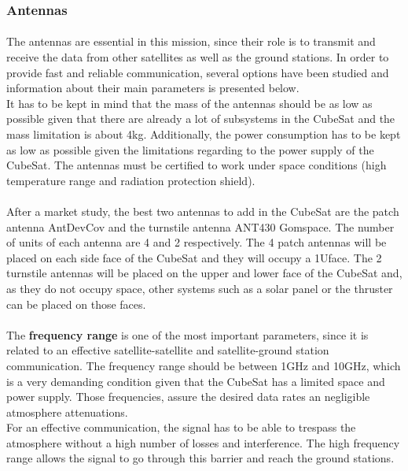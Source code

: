 \subsubsection{Antennas}
\paragraph{}The antennas are essential in this mission, since their role is to transmit and receive the data from other satellites as well as the ground stations. In order to provide fast and reliable communication, several options have been studied and information about their main parameters is presented below.\\
It has to be kept in mind that the mass of the antennas should be as low as possible given that there are already a lot of subsystems in the CubeSat and the mass limitation is about 4kg.
Additionally, the power consumption has to be kept as low as possible given the limitations regarding to the power supply of the CubeSat. The antennas must be certified to work under space conditions (high temperature range and radiation protection shield).

\paragraph{}After a market study, the best two antennas to add in the CubeSat are the patch antenna AntDevCov and the turnstile antenna ANT430 Gomspace. The number of units of each antenna are 4 and 2 respectively. The 4 patch antennas will be placed on each side face of the CubeSat and they will occupy a 1Uface. The 2 turnstile antennas will be placed on the upper and lower face of the CubeSat and, as they do not occupy space, other systems such as  a solar panel or the thruster can be placed on those faces.


\paragraph{}The \textbf{frequency range} is one of the most important parameters, since it is related to an effective satellite-satellite and satellite-ground station communication. The frequency range should be between 1GHz and 10GHz, which is a very demanding condition given that the CubeSat has a limited space and power supply. Those frequencies, assure the desired data rates an negligible atmosphere attenuations. \\
For an effective communication, the signal has to be able to trespass the atmosphere without a high number of losses and interference. The high frequency range allows the signal to go through this barrier and reach the ground stations.

